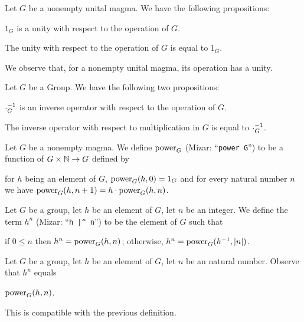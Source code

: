 \documentclass{article}
\begin{document}
Let $G$ be a nonempty unital magma. We have the following propositions:
\begin{thm}
\item\label{group1:21} $1_{G}$ is a unity with respect to the operation
  of $G$.
\item\label{group1:22} The unity with respect to the operation of $G$ is
  equal to $1_{G}$.
\end{thm}

We observe that, for a nonempty unital magma, its operation has a
unity.

Let $G$ be a Group. We have the following two propositions:
\begin{thm}
\item\label{group1:23} $\cdot_{G}^{-1}$ is an inverse operator with
  respect to the operation of $G$.
\item\label{group1:24} The inverse operator with respect to
  multiplication in $G$ is equal to $\cdot_{G}^{-1}$.
\end{thm}

\begin{definition}
Let $G$ be a nonempty magma. We define $\operatorname{power}_{G}$ (Mizar:
``\verb#power G#'') to be a function of
$G\times\mathbb{N}\to G$ defined by
\begin{defn}
\item for $h$ being an element of $G$, $\operatorname{power}_{G}(h,0)=1_{G}$ and for
  every natural number $n$ we have $\operatorname{power}_{G}(h,n+1)=h\cdot\operatorname{power}_{G}(h,n)$.
\end{defn}
\end{definition}

\begin{definition}
Let $G$ be a group, let $h$ be an element of $G$, let $n$ be an integer.
We define the term $h^{n}$ (Mizar: ``\verb#h |^ n#'') to be the element
of $G$ such that
\begin{defn}
\item if $0\leq n$ then $h^{n}=\operatorname{power}_{G}(h,n)$; otherwise, $h^{n}=\operatorname{power}_{G}(h^{-1},|n|)$.
\end{defn}
\end{definition}

\begin{definition}
Let $G$ be a group, let $h$ be an element of $G$, let $n$ be an natural
number. Observe that $h^{n}$ equals
\begin{defn}
\item $\operatorname{power}_{G}(h,n)$.
\end{defn}
This is compatible with the previous definition.
\end{definition}
\end{document}
